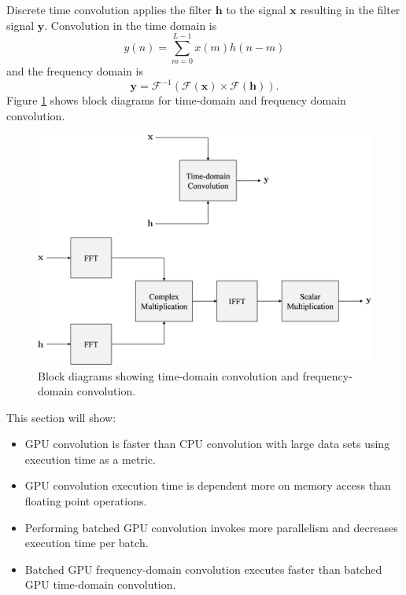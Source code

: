 Discrete time convolution applies the filter $\mathbf{h}$ to the signal $\mathbf{x}$ resulting in the filter signal $\mathbf{y}$.
Convolution in the time domain is
\begin{equation}
y(n) = \sum^{L-1}_{m=0} x(m) h(n-m)
  \label{eq:simple_conv_time}
\end{equation}
and the frequency domain is
\begin{equation}
\mathbf{y} = \mathscr{F}^{-1}(\mathscr{F}(\mathbf{x})\times\mathscr{F}(\mathbf{h})).
  \label{eq:simple_conv_freq}
\end{equation}
Figure \ref{fig:freq_time_block} shows block diagrams for time-domain and frequency domain convolution.
\begin{figure}
	\centering\includegraphics[width=10.28in/100*55]{figures/gpu_convolution/convBlock.pdf}
	\caption{Block diagrams showing time-domain convolution and frequency-domain convolution.}
	\label{fig:freq_time_block}
\end{figure}
This section will show:
\begin{itemize}
\item GPU convolution is faster than CPU convolution with large data sets using execution time as a metric.
\item GPU convolution execution time is dependent more on memory access than floating point operations.
\item Performing batched GPU convolution invokes more parallelism and decreases execution time per batch.
\item Batched GPU frequency-domain convolution executes faster than batched GPU time-domain convolution.
\end{itemize}

